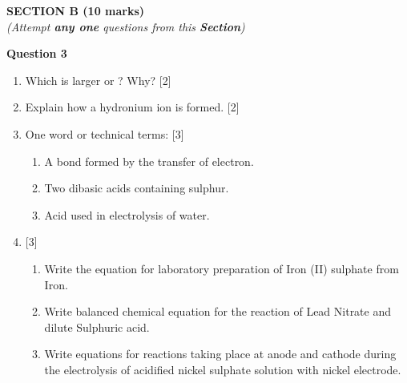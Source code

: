 \newpage
\begin{center}
   \large
   \textbf{SECTION B (10 marks)}\\
   \vspace{5mm}
   \normalsize
   \textit{(Attempt \textbf{any one} questions from this \textbf{Section})}
\end{center}
\par

\noindent
\textbf{Question 3}
\begin{enumerate}[label=(\roman*)]
 
    \item Which is larger  or ? Why? \hfill [2]

    \item Explain how a hydronium ion is formed. \hfill [2]

    \item One word or technical terms: \hfill [3]
        \begin{enumerate}[label=(\alph*)]
            \item A bond formed by the transfer of electron.
            \item Two dibasic acids containing sulphur.
            \item Acid used in electrolysis of water.
        \end{enumerate}

    \item  \hfill [3]
        \begin{enumerate}[label=(\alph*)]
            \item Write the equation for laboratory preparation of Iron (II) sulphate
                from Iron.
            \item Write balanced chemical equation for the reaction of Lead Nitrate 
                and dilute Sulphuric acid.
            \item Write equations for reactions taking place at anode and cathode during
                the electrolysis of acidified nickel sulphate solution with nickel
                electrode.
        \end{enumerate}

\end{enumerate}

